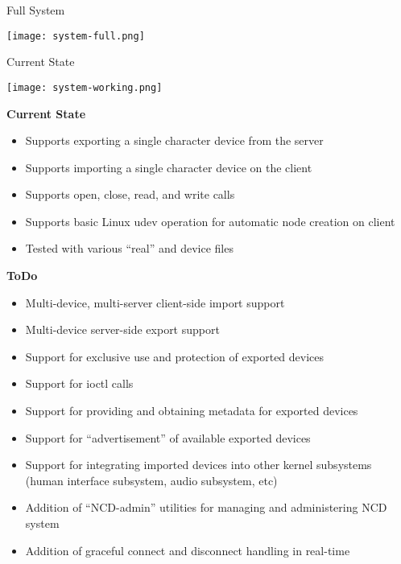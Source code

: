 \documentclass[xcolor=dvipsnames]{beamer}
\begin{document}
\begin{frame}[c]{Full System}
  \begin{center}
    \texttt{[image: system-full.png]}
  \end{center}
\end{frame}

\begin{frame}[c]{Current State}
  \begin{center}
    \texttt{[image: system-working.png]}
  \end{center}
\end{frame}

\begin{frame}{\bf Current State}

\begin{itemize}
\item Supports exporting a single character device from the server
\item Supports importing a single character device on the client
\item Supports open, close, read, and write calls
\item Supports basic Linux udev operation for automatic node
  creation on client
\item Tested with various ``real'' and device files
\end{itemize}

\end{frame}

\begin{frame}{\bf ToDo}

\begin{itemize}
\item Multi-device, multi-server client-side import support
\item Multi-device server-side export support
\item Support for exclusive use and protection of exported devices
\item Support for ioctl calls
\item Support for providing and obtaining metadata for exported
  devices
\item Support for ``advertisement'' of available exported devices
\item Support for integrating imported devices into other kernel
  subsystems (human interface subsystem, audio subsystem, etc)
\item Addition of ``NCD-admin'' utilities for managing and administering
  NCD system
\item Addition of graceful connect and disconnect handling in real-time
\end{itemize}

\end{frame}
\end{document}
